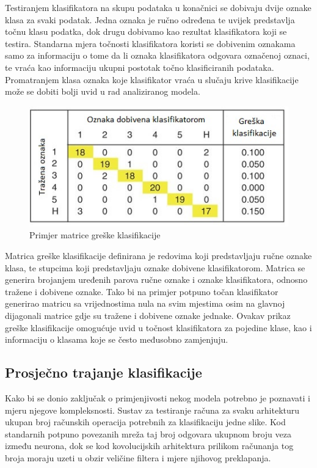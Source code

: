 \documentclass[lmodern, utf8, diplomski, numeric]{fer}
\begin{document}
Testiranjem klasifikatora na skupu podataka u konačnici se dobivaju dvije oznake klasa za svaki podatak. Jedna oznaka je ručno određena te uvijek predstavlja točnu klasu podatka, dok drugu dobivamo kao rezultat klasifikatora koji se testira. Standarna mjera točnosti klasifikatora koristi se dobivenim oznakama samo za informaciju o tome da li oznaka klasifikatora odgovara označenoj oznaci, te vraća kao informaciju ukupni postotak točno klasificiranih podataka. Promatranjem klasa oznaka koje klasifikator vraća u slučaju krive klasifikacije može se dobiti bolji uvid u rad analiziranog modela. 

\begin{figure}[ht!]
\centering
\includegraphics[width=12cm]{slike/confusion_matrix.jpg}
\caption{Primjer matrice greške klasifikacije}
\end{figure}

Matrica greške klasifikacije definirana je redovima koji predstavljaju ručne oznake klasa, te stupcima koji predstavljaju oznake dobivene klasifikatorom. Matrica se generira brojanjem uređenih parova ručne oznake i oznake klasifikatora, odnosno tražene i dobivene oznake. Tako bi na primjer potpuno točan klasifikator generirao matricu sa vrijednostima nula na svim mjestima osim na glavnoj dijagonali matrice gdje su tražene i dobivene oznake jednake.
Ovakav prikaz greške klasifikacije omogućuje uvid u točnost klasifikatora za pojedine klase, kao i informaciju o klasama koje se često međusobno zamjenjuju.



\subsection{Prosječno trajanje klasifikacije}

Kako bi se donio zaključak o primjenjivosti nekog modela potrebno je poznavati i mjeru njegove kompleksnosti. Sustav za testiranje računa za svaku arhitekturu ukupan broj računskih operacija potrebnih za klasifikaciju jedne slike. Kod standarnih potpuno povezanih mreža taj broj odgovara ukupnom broju veza između neurona, dok se kod kovolucijskih arhitektura prilikom računanja tog broja moraju uzeti u obzir veličine filtera i mjere njihovog preklapanja. 
\end{document}
